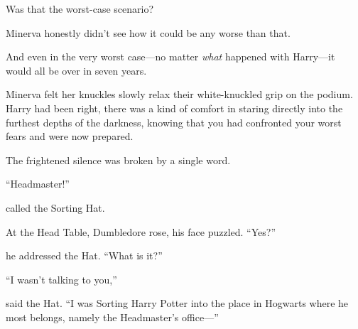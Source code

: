 Was that the worst-case scenario?

Minerva honestly didn't see how it could be any worse than that.

And even in the very worst case---no matter \emph{what} happened with
Harry---it would all be over in seven years.

Minerva felt her knuckles slowly relax their white-knuckled grip on the
podium. Harry had been right, there was a kind of comfort in staring
directly into the furthest depths of the darkness, knowing that you had
confronted your worst fears and were now prepared.

The frightened silence was broken by a single word.

``Headmaster!''

called the Sorting Hat.

At the Head Table, Dumbledore rose, his face puzzled. ``Yes?''

he addressed the Hat. ``What is it?''

``I wasn't talking to you,''

said the Hat. ``I was Sorting Harry Potter into the place in Hogwarts
where he most belongs, namely the Headmaster's office---''
